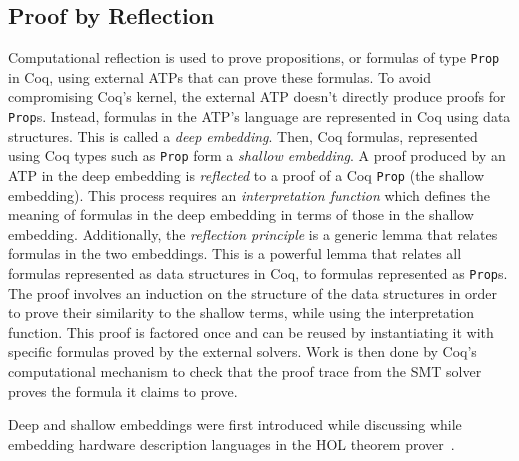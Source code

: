 \documentclass{article}
\begin{document}
	\subsection{Proof by Reflection}
	\label{reflect}
	Computational reflection is used 
	to prove propositions, or formulas 
	of type \texttt{Prop} in Coq,
	using external ATPs that can prove 
	these formulas. To avoid 
	compromising Coq's kernel, the
	external ATP doesn't directly 
	produce proofs for \texttt{Prop}s.
	Instead, formulas in the ATP's 
	language are represented in Coq
	using data structures. This is 
	called a \textit{deep embedding}.
	Then, Coq formulas, represented 
	using Coq types such as 
	\texttt{Prop} form a 
	\textit{shallow embedding}. 
	A proof produced by an ATP in 
	the deep embedding is 
	\textit{reflected} to a proof 
	of a Coq \texttt{Prop} (the 
	shallow embedding). This 
	process requires an 
	\textit{interpretation function}
	which defines the meaning of 
	formulas in the deep embedding in 
	terms of those in the shallow 
	embedding. Additionally, the 
	\textit{reflection principle} is 
	a generic lemma that relates 
	formulas in the two embeddings. 
	This is a powerful lemma that 
	relates all formulas represented
	as data structures in Coq, to 
	formulas represented as 
	\texttt{Prop}s. The proof 
	involves an induction 
	on the structure of the data 
	structures in order to prove 
	their similarity to the shallow 
	terms, while using the
	interpretation function. This 
	proof is factored once and 
	can be reused by instantiating 
	it with specific formulas 
	proved by the external solvers. 
	Work is then done by Coq's 
	computational mechanism to 
	check that the proof trace
	from the SMT solver proves 
	the formula it claims to prove.
	
	Deep and shallow embeddings were 
	first introduced while discussing 
	while embedding hardware 
	description languages in the HOL
	theorem 
	prover~\cite{10.5555/645902.672777}.
	
	


\end{document}
